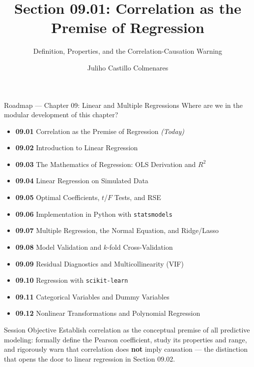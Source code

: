 \documentclass[10pt, aspectratio=169]{beamer}
\title[Correlation]{Section 09.01: Correlation as the Premise of Regression}
\subtitle{Definition, Properties, and the Correlation-Causation Warning}
\author[J. Castillo Colmenares]{Juliho Castillo Colmenares}
\institute{Tecnológico de Monterrey}
\date{\vspace{-1.5cm}}
\begin{document}
\begin{frame}[plain]
  \titlepage
\end{frame}

\begin{frame}{Roadmap --- Chapter 09: Linear and Multiple Regressions}
  \scriptsize
  Where are we in the modular development of this chapter?
  \begin{itemize}\itemsep=0.02em
    \item \textbf{09.01} Correlation as the Premise of Regression \emph{(Today)}
    \item \textbf{09.02} Introduction to Linear Regression
    \item \textbf{09.03} The Mathematics of Regression: OLS Derivation and $R^2$
    \item \textbf{09.04} Linear Regression on Simulated Data
    \item \textbf{09.05} Optimal Coefficients, $t$/$F$ Tests, and RSE
    \item \textbf{09.06} Implementation in Python with \texttt{statsmodels}
    \item \textbf{09.07} Multiple Regression, the Normal Equation, and Ridge/Lasso
    \item \textbf{09.08} Model Validation and $k$-fold Cross-Validation
    \item \textbf{09.09} Residual Diagnostics and Multicollinearity (VIF)
    \item \textbf{09.10} Regression with \texttt{scikit-learn}
    \item \textbf{09.11} Categorical Variables and Dummy Variables
    \item \textbf{09.12} Nonlinear Transformations and Polynomial Regression
  \end{itemize}
  \pause
  \vspace{-0.05cm}
  \begin{block}{Session Objective}
    Establish correlation as the conceptual premise of all predictive modeling: formally define the Pearson coefficient, study its properties and range, and rigorously warn that correlation does \textbf{not} imply causation --- the distinction that opens the door to linear regression in Section 09.02.
  \end{block}
\end{frame}
\end{document}
